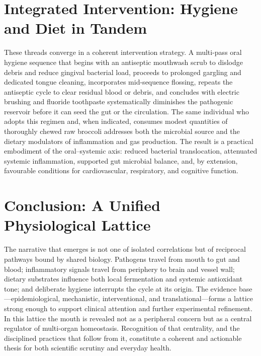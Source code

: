 \documentclass[11pt,a4paper]{article}
\begin{document}
\section{Integrated Intervention: Hygiene and Diet in Tandem}
These threads converge in a coherent intervention strategy. A multi-pass oral hygiene sequence that begins with an antiseptic mouthwash scrub to dislodge debris and reduce gingival bacterial load, proceeds to prolonged gargling and dedicated tongue cleaning, incorporates mid-sequence flossing, repeats the antiseptic cycle to clear residual blood or debris, and concludes with electric brushing and fluoride toothpaste systematically diminishes the pathogenic reservoir before it can seed the gut or the circulation. The same individual who adopts this regimen and, when indicated, consumes modest quantities of thoroughly chewed raw broccoli addresses both the microbial source and the dietary modulators of inflammation and gas production. The result is a practical embodiment of the oral--systemic axis: reduced bacterial translocation, attenuated systemic inflammation, supported gut microbial balance, and, by extension, favourable conditions for cardiovascular, respiratory, and cognitive function.

\section{Conclusion: A Unified Physiological Lattice}
The narrative that emerges is not one of isolated correlations but of reciprocal pathways bound by shared biology. Pathogens travel from mouth to gut and blood; inflammatory signals travel from periphery to brain and vessel wall; dietary substrates influence both local fermentation and systemic antioxidant tone; and deliberate hygiene interrupts the cycle at its origin. The evidence base---epidemiological, mechanistic, interventional, and translational---forms a lattice strong enough to support clinical attention and further experimental refinement. In this lattice the mouth is revealed not as a peripheral concern but as a central regulator of multi-organ homeostasis. Recognition of that centrality, and the disciplined practices that follow from it, constitute a coherent and actionable thesis for both scientific scrutiny and everyday health.
\end{document}
